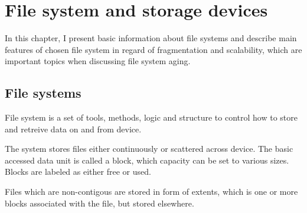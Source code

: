 \documentclass[
  color, %
  table, %
  lof,   %
  lot,   %
]{fithesis3}
\begin{document}






\chapter{File system and storage devices}
In this chapter, I present basic information about file systems and describe main features of chosen file system in regard of fragmentation and scalability, which are important topics when discussing file system aging.

\section{File systems}
File system is a set of tools, methods, logic and structure to control how to store and retreive data on and from device.

The system stores files either continuously or scattered across device. The basic accessed data unit is called a block, which capacity can be set to various sizes. Blocks are labeled as either free or used.

Files which are non-contigous are stored in form of extents, which is one or more blocks associated with the file, but stored elsewhere.  
\end{document}
